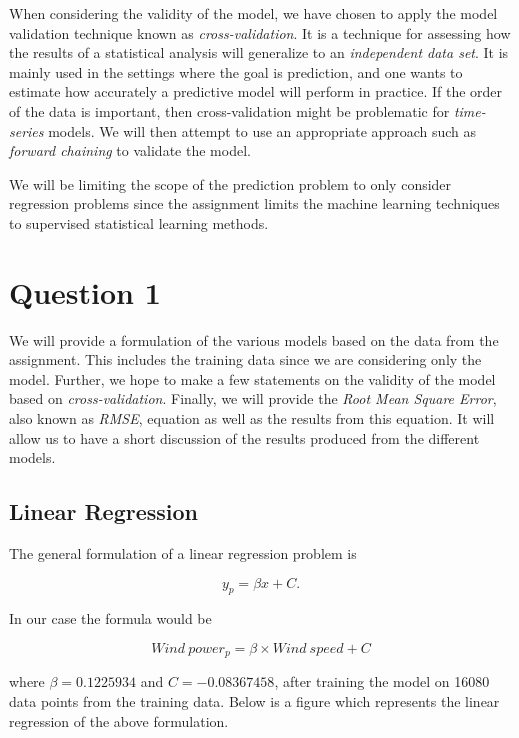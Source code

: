 \documentclass[
11pt, %
english, %
singlespacing, %
parskip, %
headsepline, %
]{report} %
\begin{document}
    When considering the validity of the model, we have chosen to apply the model validation technique known as \emph{cross-validation}. It is a technique for assessing how the results of a statistical analysis will generalize to an \emph{independent data set}. It is mainly used in the settings where the goal is prediction, and one wants to estimate how accurately a predictive model will perform in practice. If the order of the data is important, then cross-validation might be problematic for \emph{time-series} models. We will then attempt to use an appropriate approach such as \emph{forward chaining} to validate the model.

    We will be limiting the scope of the prediction problem to only consider regression problems since the assignment limits the machine learning techniques to supervised statistical learning methods.

\section{Question 1}
    We will provide a formulation of the various models based on the data from the assignment. This includes the training data since we are considering only the model. Further, we hope to make a few statements on the validity of the model based on \emph{cross-validation}. Finally, we will provide the \emph{Root Mean Square Error}, also known as \emph{RMSE}, equation as well as the results from this equation. It will allow us to have a short discussion of the results produced from the different models.

\subsection{Linear Regression}
    The general formulation of a linear regression problem is    
    
    \begin{equation}
        y_{p} = \beta x + C.
    \end{equation}
    
    In our case the formula would be
    
    \begin{equation}
        Wind\ power_{p} = \beta \times Wind\ speed + C
    \end{equation}
    
    where $\beta = 0.1225934$ and $C = -0.08367458$, after training the model on 16080 data points from the training data. Below is a figure which represents the linear regression of the above formulation.
    
\end{document}
